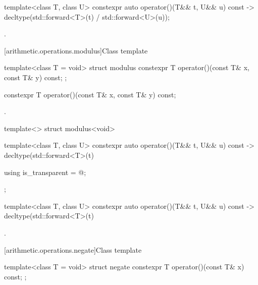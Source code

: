 %
\begin{itemdecl}
template<class T, class U> constexpr auto operator()(T&& t, U&& u) const
    -> decltype(std::forward<T>(t) / std::forward<U>(u));
\end{itemdecl}

\begin{itemdescr}
\pnum
\returns
{}.
\end{itemdescr}

[arithmetic.operations.modulus]{Class template }

%
\begin{itemdecl}
template<class T = void> struct modulus {
  constexpr T operator()(const T& x, const T& y) const;
};
\end{itemdecl}

%
\begin{itemdecl}
constexpr T operator()(const T& x, const T& y) const;
\end{itemdecl}

\begin{itemdescr}
\pnum
\returns
{}.
\end{itemdescr}

%
\begin{itemdecl}
template<> struct modulus<void> {
  template<class T, class U> constexpr auto operator()(T&& t, U&& u) const
    -> decltype(std::forward<T>(t) %

  using is_transparent = @\unspec@;
};
\end{itemdecl}

%
\begin{itemdecl}
template<class T, class U> constexpr auto operator()(T&& t, U&& u) const
    -> decltype(std::forward<T>(t) %
\end{itemdecl}

\begin{itemdescr}
\pnum
\returns
{}.
\end{itemdescr}

[arithmetic.operations.negate]{Class template }

%
\begin{itemdecl}
template<class T = void> struct negate {
  constexpr T operator()(const T& x) const;
};
\end{itemdecl}

